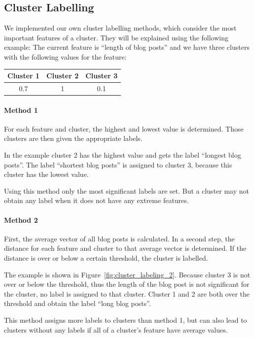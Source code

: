 \subsection{Cluster Labelling}
\label{sec:impl_cluster_labeling}

We implemented our own cluster labelling methods, which consider the most important features of a cluster.
They will be explained using the following example:
The current feature is ``length of blog posts'' and we have three clusters with the following values for the feature:
\begin{center}
\begin{tabular}{c|c|c}
  Cluster 1 & Cluster 2 & Cluster 3 \\ \hline
  0.7 & 1 & 0.1 \\
 \end{tabular}
\end{center}


\paragraph{Method 1}
For each feature and cluster, the highest and lowest value is determined.
Those clusters are then given the appropriate labels.

In the example cluster 2 has the highest value and gets the label ``longest blog posts''.
The label ``shortest blog posts'' is assigned to cluster 3, because this cluster has the lowest value.

Using this method only the most significant labels are set.
But a cluster may not obtain any label when it does not have any extreme features.


\paragraph{Method 2}
First, the average vector of all blog posts is calculated.
In a second step, the distance for each feature and cluster to that average vector is determined.
If the distance is over or below a certain threshold, the cluster is labelled.

The example is shown in Figure~\ref{fig:cluster_labeling_2}.
Because cluster 3 is not over or below the threshold, thus the length of the blog post is not significant for the cluster, no label is assigned to that cluster.
Cluster 1 and 2 are both over the threshold and obtain the label ``long blog posts''.

This method assigns more labels to clusters than method 1, but can also lead to clusters without any labels if all of a cluster's feature have average values.

